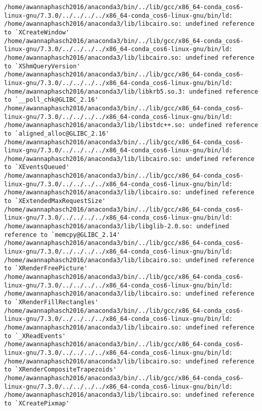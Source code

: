 \documentclass[11pt]{article}
\begin{document}
\begin{enumerate}
\begin{enumerate}
\begin{verbatim}
/home/awannaphasch2016/anaconda3/bin/../lib/gcc/x86_64-conda_cos6-linux-gnu/7.3.0/../../../../x86_64-conda_cos6-linux-gnu/bin/ld: /home/awannaphasch2016/anaconda3/lib/libcairo.so: undefined reference to `XCreateWindow'
/home/awannaphasch2016/anaconda3/bin/../lib/gcc/x86_64-conda_cos6-linux-gnu/7.3.0/../../../../x86_64-conda_cos6-linux-gnu/bin/ld: /home/awannaphasch2016/anaconda3/lib/libcairo.so: undefined reference to `XShmQueryVersion'
/home/awannaphasch2016/anaconda3/bin/../lib/gcc/x86_64-conda_cos6-linux-gnu/7.3.0/../../../../x86_64-conda_cos6-linux-gnu/bin/ld: /home/awannaphasch2016/anaconda3/lib/libkrb5.so.3: undefined reference to `__poll_chk@GLIBC_2.16'
/home/awannaphasch2016/anaconda3/bin/../lib/gcc/x86_64-conda_cos6-linux-gnu/7.3.0/../../../../x86_64-conda_cos6-linux-gnu/bin/ld: /home/awannaphasch2016/anaconda3/lib/libstdc++.so: undefined reference to `aligned_alloc@GLIBC_2.16'
/home/awannaphasch2016/anaconda3/bin/../lib/gcc/x86_64-conda_cos6-linux-gnu/7.3.0/../../../../x86_64-conda_cos6-linux-gnu/bin/ld: /home/awannaphasch2016/anaconda3/lib/libcairo.so: undefined reference to `XEventsQueued'
/home/awannaphasch2016/anaconda3/bin/../lib/gcc/x86_64-conda_cos6-linux-gnu/7.3.0/../../../../x86_64-conda_cos6-linux-gnu/bin/ld: /home/awannaphasch2016/anaconda3/lib/libcairo.so: undefined reference to `XExtendedMaxRequestSize'
/home/awannaphasch2016/anaconda3/bin/../lib/gcc/x86_64-conda_cos6-linux-gnu/7.3.0/../../../../x86_64-conda_cos6-linux-gnu/bin/ld: /home/awannaphasch2016/anaconda3/lib/libglib-2.0.so: undefined reference to `memcpy@GLIBC_2.14'
/home/awannaphasch2016/anaconda3/bin/../lib/gcc/x86_64-conda_cos6-linux-gnu/7.3.0/../../../../x86_64-conda_cos6-linux-gnu/bin/ld: /home/awannaphasch2016/anaconda3/lib/libcairo.so: undefined reference to `XRenderFreePicture'
/home/awannaphasch2016/anaconda3/bin/../lib/gcc/x86_64-conda_cos6-linux-gnu/7.3.0/../../../../x86_64-conda_cos6-linux-gnu/bin/ld: /home/awannaphasch2016/anaconda3/lib/libcairo.so: undefined reference to `XRenderFillRectangles'
/home/awannaphasch2016/anaconda3/bin/../lib/gcc/x86_64-conda_cos6-linux-gnu/7.3.0/../../../../x86_64-conda_cos6-linux-gnu/bin/ld: /home/awannaphasch2016/anaconda3/lib/libcairo.so: undefined reference to `_XReadEvents'
/home/awannaphasch2016/anaconda3/bin/../lib/gcc/x86_64-conda_cos6-linux-gnu/7.3.0/../../../../x86_64-conda_cos6-linux-gnu/bin/ld: /home/awannaphasch2016/anaconda3/lib/libcairo.so: undefined reference to `XRenderCompositeTrapezoids'
/home/awannaphasch2016/anaconda3/bin/../lib/gcc/x86_64-conda_cos6-linux-gnu/7.3.0/../../../../x86_64-conda_cos6-linux-gnu/bin/ld: /home/awannaphasch2016/anaconda3/lib/libcairo.so: undefined reference to `XCreatePixmap'

\end{verbatim}
\end{enumerate}
\end{enumerate}
\end{document}
